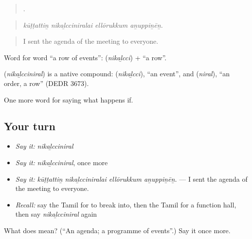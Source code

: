 \begin{quote}
   .
\end{quote}

\begin{quote}
\emph{kūṭṭattiṉ nikaḻcciniralai ellōrukkum aṉuppiṉēṉ.}
\end{quote}

\begin{quote}
I sent the agenda of the meeting to everyone.
\end{quote}

Word for word \textquotedblleft{}a row of events\textquotedblright{}:  (\emph{nikaḻcci}) +  \textquotedblleft{}a row\textquotedblright{}.

\begin{cousinweb}
\textbf{} (\emph{nikaḻcciniral}) is a native compound:  (\emph{nikaḻcci}), \textquotedblleft{}an event\textquotedblright{}, and  (\emph{niral}), \textquotedblleft{}an order, a row\textquotedblright{} (DEDR 3673).
\end{cousinweb}

\begin{grammarlens}[title={What you've built}]
One more word for saying what happens if.
\end{grammarlens}

\subsection*{Your turn}
\begin{itemize}
\raggedright
  \item \emph{Say it:} \emph{nikaḻcciniral}
  \item \emph{Say it:} \emph{nikaḻcciniral}, once more
  \item \emph{Say it:} \emph{kūṭṭattiṉ nikaḻcciniralai ellōrukkum aṉuppiṉēṉ.} — I sent the agenda of the meeting to everyone.
  \item \emph{Recall:} say the Tamil for to break into, then the Tamil for a function hall, then say \emph{nikaḻcciniral} again
\end{itemize}

\begin{tcolorbox}[breakable,colback=teal!4,colframe=teal!35!black,title={Before you move on}]
What does  mean? (\textquotedblleft{}An agenda; a programme of events\textquotedblright{}.) Say it once more.
\end{tcolorbox}
